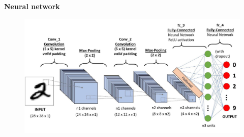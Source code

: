 \documentclass[xcolor=dvipsnames]{beamer}
\begin{document}
\begin{frame}{\bf Neural network}
  \begin{figure}
    \includegraphics[scale=0.1]{../../pictures/cnn.jpg}
  \end{figure}

\end{frame}
\end{document}
